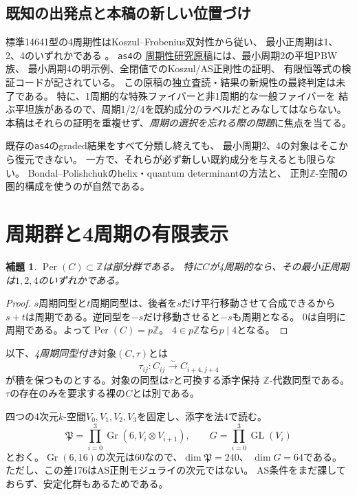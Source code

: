 \documentclass[11pt,a4paper]{ltjsarticle}
\newtheorem{lemma}[theorem]{補題}
\theoremstyle{definition}
\newcommand{\ZZ}{\mathbb Z}
\newcommand{\GL}{\operatorname{GL}}
\newcommand{\Gr}{\operatorname{Gr}}
\newcommand{\Per}{\operatorname{Per}}
\begin{document}
\subsection*{既知の出発点と本稿の新しい位置づけ}
標準14641型の4周期性はKoszul--Frobenius双対性から従い、
最小正周期は1、2、4のいずれかである
\cite{BP,MoriNyman}。
\texttt{as4}の
\href{https://github.com/uedakazushi/as4/blob/main/research/z_periodicity/papers/as4_z_periodicity_ja.tex}
{周期性研究原稿}には、最小周期2の平坦PBW族、
最小周期4の明示例、全閉値でのKoszul/AS正則性の証明、
有限恒等式の検証コードが記されている。
この原稿の独立査読・結果の新規性の最終判定は未了である。
特に、1周期的な特殊ファイバーと非1周期的な一般ファイバーを
結ぶ平坦族があるので、周期1/2/4を既約成分のラベルだとみなしてはならない。
本稿はそれらの証明を重複せず、\emph{周期の選択を忘れる際の問題}に焦点を当てる。

既存の\texttt{as4}のgraded結果をすべて分類し終えても、
最小周期2、4の対象はそこから復元できない。
一方で、それらが必ず新しい既約成分を与えるとも限らない。
Bondal--Polishchukのhelix・quantum determinantの方法\cite{BP}と、
正則$\ZZ$-空間の圏的構成\cite{MoriNyman}を使うのが自然である。

\section{周期群と4周期の有限表示}
\begin{lemma}\label{lem:period-subgroup}
$\Per(C)\subset\ZZ$は部分群である。
特に$C$が4周期的なら、その最小正周期は$1,2,4$のいずれかである。
\end{lemma}
\begin{proof}
$s$周期同型と$t$周期同型は、後者を$s$だけ平行移動させて合成できるから
$s+t$は周期である。逆同型を$-s$だけ移動させると$-s$も周期となる。
$0$は自明に周期である。よって$\Per(C)=p\ZZ$。
$4\in p\ZZ$なら$p\mid4$となる。
\end{proof}

以下、\emph{4周期同型付き}対象$(C,\tau)$とは
\[
 \tau_{ij}:C_{ij}\xrightarrow{\sim}C_{i+4,j+4}
\]
が積を保つものとする。対象の同型は$\tau$と可換する添字保持
$\ZZ$-代数同型である。
$\tau$の存在のみを要求する裸の$C$とは別である。

四つの4次元$k$-空間$V_0,V_1,V_2,V_3$を固定し、添字を法4で読む。
\[
 \mathfrak P=\prod_{i=0}^{3}\Gr(6,V_i\otimes V_{i+1}),
 \qquad G=\prod_{i=0}^3\GL(V_i)
\]
とおく。$\Gr(6,16)$の次元は60なので、$\dim\mathfrak P=240$、
$\dim G=64$である。
ただし、この差176はAS正則モジュライの次元ではない。
AS条件をまだ課しておらず、安定化群もあるためである。
\end{document}
